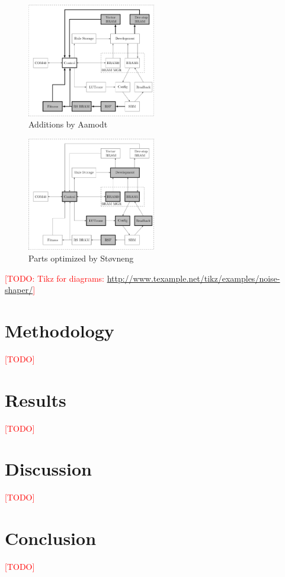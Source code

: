 \documentclass[a4paper]{IEEEtran}
\newcommand\TODO{\textcolor{red}{[TODO]}}
\newcommand\todo[1]{\textcolor{red}{[TODO: #1]}}
\begin{document}
\begin{figure}[h!]
    \centering
    \includegraphics[width=0.5\textwidth]{figures/ca-aamodt}
    \caption{Additions by Aamodt}
    \label{fig:ca-aamodt}
\end{figure}

\begin{figure}[h!]
    \centering
    \includegraphics[width=0.5\textwidth]{figures/ca-stovneng}
    \caption{Parts optimized by Støvneng}
    \label{fig:ca-stovneng}
\end{figure}

\todo{Tikz for diagrams: \url{http://www.texample.net/tikz/examples/noise-shaper/}}

\section{Methodology}

\TODO

\section{Results}

\TODO

\section{Discussion}

\TODO

\section{Conclusion}

\TODO



\end{document}
